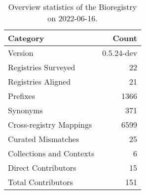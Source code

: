 \begin{table}
\centering
\caption{Overview statistics of the Bioregistry on 2022-06-16.}
\label{tab:bioregistry-summary}
\begin{tabular}{lr}
\toprule
                Category &      Count \\
\midrule
                 Version & 0.5.24-dev \\
     Registries Surveyed &         22 \\
      Registries Aligned &         21 \\
                Prefixes &       1366 \\
                Synonyms &        371 \\
 Cross-registry Mappings &       6599 \\
      Curated Mismatches &         25 \\
Collections and Contexts &          6 \\
     Direct Contributors &         15 \\
      Total Contributors &        151 \\
\bottomrule
\end{tabular}
\end{table}
